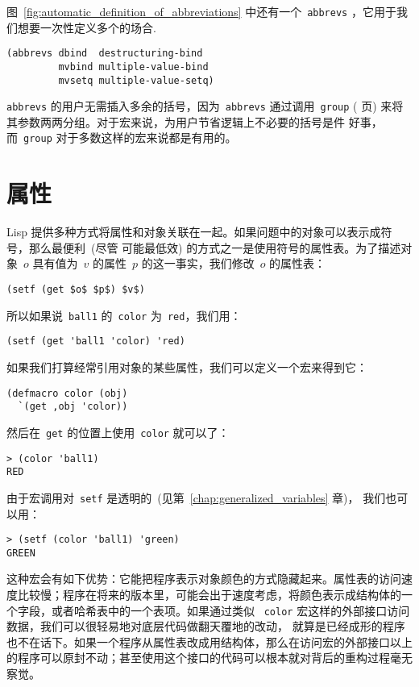 图~\ref{fig:automatic_definition_of_abbreviations} 中还有一个~\texttt{abbrevs}
，它用于我们想要一次性定义多个\abbrev{}的场合.
\begin{lstlisting}
(abbrevs dbind  destructuring-bind
         mvbind multiple-value-bind
         mvsetq multiple-value-setq)
\end{lstlisting}
\texttt{abbrevs} 的用户无需插入多余的括号，因为~\texttt{abbrevs} 通过调用~\texttt{group}
(\pageref{fun:group} 页) 来将其参数两两分组。对于宏来说，为用户节省逻辑上不必要的括号是件
好事，而~\texttt{group} 对于多数这样的宏来说都是有用的。

\section{属性}
\label{sec:properties}

Lisp 提供多种方式将属性和对象关联在一起。如果问题中的对象可以表示成符号，那么最便利~(尽管
可能最低效) 的方式之一是使用符号的属性表。为了描述对象~$o$ 具有值为~$v$ 的属性~$p$
的这一事实，我们修改~$o$ 的属性表：
\begin{lstlisting}
(setf (get $o$ $p$) $v$)
\end{lstlisting}
所以如果说~\texttt{ball1} 的~\texttt{color} 为~\texttt{red}，我们用：
\begin{lstlisting}
(setf (get 'ball1 'color) 'red)
\end{lstlisting}
如果我们打算经常引用对象的某些属性，我们可以定义一个宏来得到它：
\begin{lstlisting}
(defmacro color (obj)
  `(get ,obj 'color))
\end{lstlisting}
然后在~\texttt{get} 的位置上使用~\texttt{color} 就可以了：
\begin{lstlisting}
> (color 'ball1)
RED
\end{lstlisting}
由于宏调用对~\texttt{setf} 是透明的~(见第~\ref{chap:generalized_variables} 章)，
我们也可以用：
\begin{lstlisting}
> (setf (color 'ball1) 'green)
GREEN
\end{lstlisting}

这种宏会有如下优势：它能把程序表示对象颜色的方式隐藏起来。属性表的访问速度比较慢；程序在将来的版本里，可能会出于速度考虑，将颜色表示成结构体的一个字段，或者哈希表中的一个表项。如果通过类似
~\texttt{color} 宏这样的外部接口访问数据，我们可以很轻易地对底层代码做翻天覆地的改动，
就算是已经成形的程序也不在话下。如果一个程序从属性表改成用结构体，那么在访问宏的外部接口以上的程序可以原封不动；甚至使用这个接口的代码可以根本就对背后的重构过程毫无察觉。

